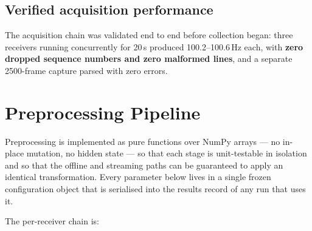 \subsection{Verified acquisition performance}

The acquisition chain was validated end to end before collection began:
three receivers running concurrently for 20\,s produced
100.2--100.6\,Hz each, with \textbf{zero dropped sequence numbers and zero
malformed lines}, and a separate 2500-frame capture parsed with zero errors.

\section{Preprocessing Pipeline}

Preprocessing is implemented as pure functions over NumPy arrays --- no
in-place mutation, no hidden state --- so that each stage is unit-testable
in isolation and so that the offline and streaming paths can be guaranteed
to apply an identical transformation. Every parameter below lives in a
single frozen configuration object that is serialised into the results
record of any run that uses it.

The per-receiver chain is:

